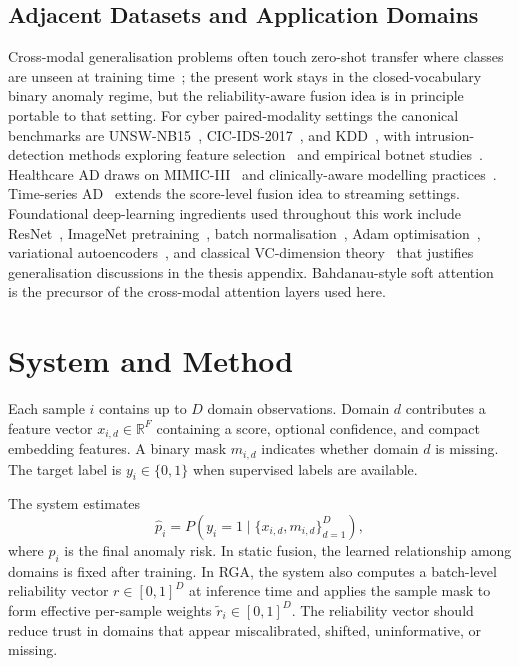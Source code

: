 \documentclass[10pt,conference]{IEEEtran}
\newcommand{\method}{RGA}
\begin{document}
\subsection{Adjacent Datasets and Application Domains}
Cross-modal generalisation problems often touch zero-shot transfer where
classes are unseen at training time~\cite{wang2020deep}; the present work
stays in the closed-vocabulary binary anomaly regime, but the
reliability-aware fusion idea is in principle portable to that setting.
For cyber paired-modality settings the canonical benchmarks are
UNSW-NB15~\cite{moustafa2015unsw}, CIC-IDS-2017~\cite{sharafaldin2018cicids},
and KDD~\cite{kdd1999cup}, with intrusion-detection methods
exploring feature selection~\cite{kasongo2020performance,vinayakumar2019deep}
and empirical botnet studies~\cite{garcia2020cyber}. Healthcare AD draws
on MIMIC-III~\cite{johnson2016mimiciii} and clinically-aware modelling
practices~\cite{tonekaboni2019clinicians,rajkomar2018scalable}.
Time-series AD~\cite{schmidl2022anomaly,audibert2020usad,zhao2020multivariate}
extends the score-level fusion idea to streaming settings. Foundational
deep-learning ingredients used throughout this work include
ResNet~\cite{he2016deep},
ImageNet pretraining~\cite{krizhevsky2012imagenet},
batch normalisation~\cite{ioffe2015batch},
Adam optimisation~\cite{kingma2014adam},
variational autoencoders~\cite{kingma2014autoencoding}, and
classical VC-dimension theory~\cite{vapnik1971uniform} that justifies
generalisation discussions in the thesis appendix. Bahdanau-style
soft attention~\cite{bahdanau2014neural} is the precursor of the
cross-modal attention layers used here.

\section{System and Method}
Each sample $i$ contains up to $D$ domain observations. Domain $d$ contributes a
feature vector $x_{i,d} \in \mathbb{R}^{F}$ containing a score, optional
confidence, and compact embedding features. A binary mask $m_{i,d}$ indicates
whether domain $d$ is missing. The target label is $y_i \in \{0,1\}$ when
supervised labels are available.

The system estimates
\begin{equation}
  \hat{p}_i = P(y_i=1 \mid \{x_{i,d},m_{i,d}\}_{d=1}^{D}),
\end{equation}
where $\hat{p}_i$ is the final anomaly risk. In static fusion, the learned
relationship among domains is fixed after training. In \method, the system also
computes a batch-level reliability vector $r \in [0,1]^D$ at inference time and
applies the sample mask to form effective per-sample weights
$\tilde r_i \in [0,1]^D$. The reliability vector should reduce trust in domains
that appear miscalibrated, shifted, uninformative, or missing.
\end{document}
